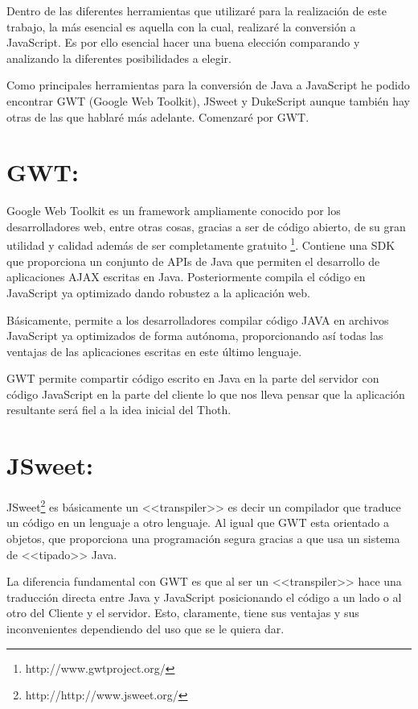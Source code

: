 
Dentro de las diferentes herramientas que utilizaré para la realización de este trabajo, la más esencial es aquella con la cual, realizaré la conversión a JavaScript. Es por ello esencial hacer una buena elección comparando y analizando la diferentes posibilidades a elegir.

Como principales herramientas para la conversión de Java a JavaScript he podido encontrar GWT (Google Web Toolkit), JSweet y DukeScript aunque también hay otras de las que hablaré más adelante. Comenzaré por GWT.

\section{GWT:}

Google Web Toolkit es un framework ampliamente conocido por los desarrolladores web, entre otras cosas, gracias a ser de código abierto, de su gran utilidad y calidad además de ser completamente gratuito \footnote{http://www.gwtproject.org/}.
Contiene una SDK que proporciona un conjunto de APIs de Java que permiten el desarrollo de aplicaciones AJAX escritas en Java. Posteriormente compila el código en JavaScript ya optimizado dando robustez a la aplicación web.

Básicamente, permite a los desarrolladores compilar código JAVA en archivos JavaScript ya optimizados de forma autónoma, proporcionando así todas las ventajas de las aplicaciones escritas en este último lenguaje. 

GWT permite compartir código escrito en Java en la parte del servidor con código JavaScript en la parte del cliente lo que nos lleva pensar que la aplicación resultante será fiel a la idea inicial del Thoth. 


\section{JSweet:}

JSweet\footnote{http://http://www.jsweet.org/} es básicamente un <<transpiler>> es decir un compilador que traduce un código en un lenguaje a otro lenguaje. Al igual que GWT esta orientado a objetos, que proporciona una programación segura gracias a que usa un sistema de <<tipado>> Java.

La diferencia fundamental con GWT es que al ser un <<transpiler>> hace una traducción directa entre Java y JavaScript posicionando el código a un lado o al otro del Cliente y el servidor. Esto, claramente, tiene sus ventajas y sus inconvenientes dependiendo del uso que se le quiera dar.

